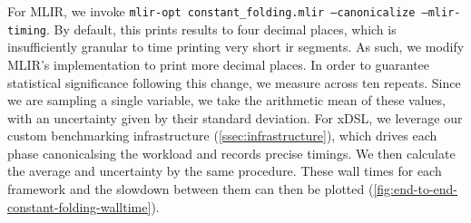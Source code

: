 For MLIR, we invoke \texttt{mlir-opt constant\_folding.mlir --canonicalize --mlir-timing}. By default, this prints results to four decimal places, which is insufficiently granular to time printing very short \ac{ir} segments. As such, we modify MLIR's implementation to print more decimal places. In order to guarantee statistical significance following this change, we measure across ten repeats. Since we are sampling a single variable, we take the arithmetic mean of these values, with an uncertainty given by their standard deviation.
For xDSL, we leverage our custom benchmarking infrastructure (\autoref{ssec:infrastructure}), which drives each phase canonicalsing the workload and records precise timings. We then calculate the average and uncertainty by the same procedure.
These wall times for each framework and the slowdown between them can then be plotted (\autoref{fig:end-to-end-constant-folding-walltime}).


